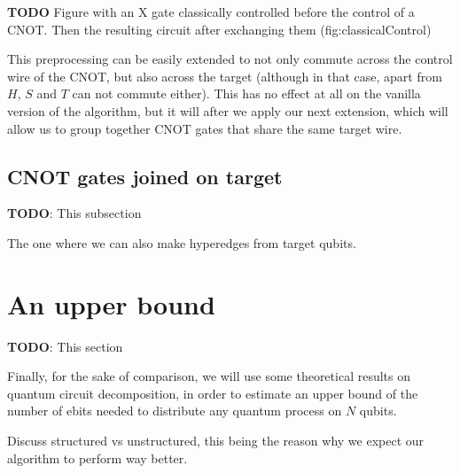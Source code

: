 \textbf{TODO} Figure with an X gate classically controlled before the control of a CNOT. Then the resulting circuit after exchanging them (fig:classicalControl)

This preprocessing can be easily extended to not only commute across the control wire of the CNOT, but also across the target (although in that case, apart from \(H\), \(S\) and \(T\) can not commute either). This has no effect at all on the vanilla version of the algorithm, but it will after we apply our next extension, which will allow us to group together CNOT gates that share the same target wire.



\subsection{CNOT gates joined on target}
\label{BothEnds}

\textbf{TODO}: This subsection

The one where we can also make hyperedges from target qubits.



\section{An upper bound}

\textbf{TODO}: This section

Finally, for the sake of comparison, we will use some theoretical results on quantum circuit decomposition, in order to estimate an upper bound of the number of ebits needed to distribute any quantum process on \(N\) qubits.

Discuss structured vs unstructured, this being the reason why we expect our algorithm to perform way better.